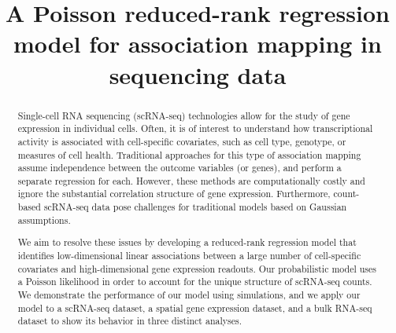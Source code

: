 \documentclass{bmcart}
\begin{document}
\begin{frontmatter}

\begin{fmbox}
\title{A Poisson reduced-rank regression model for association mapping in sequencing data}

\author[
  addressref={aff1},
  email={tianaf@princeton.edu}
]{ }
\author[
  addressref={aff1},
  email={aj13@princeton.edu}
]{ }
\author[
  addressref={aff1,aff2},
  corref={aff1,aff2},
  email={bee@princeton.edu}
]{ }

\address[id=aff1]{
  ,
  ,
  ,
}
\address[id=aff2]{
  ,
  ,
  ,
}

\end{fmbox}%

\begin{abstractbox}

\begin{abstract} %
Single-cell RNA sequencing (scRNA-seq) technologies allow for the study of gene expression in individual cells. Often, it is of interest to understand how transcriptional activity is associated with cell-specific covariates, such as cell type, genotype, or measures of cell health. Traditional approaches for this type of association mapping assume independence between the outcome variables (or genes), and perform a separate regression for each. However, these methods are computationally costly and ignore the substantial correlation structure of gene expression. Furthermore, count-based scRNA-seq data pose challenges for traditional models based on Gaussian assumptions.

We aim to resolve these issues by developing a reduced-rank regression model that identifies low-dimensional linear associations between a large number of cell-specific covariates and high-dimensional gene expression readouts. Our probabilistic model uses a Poisson likelihood in order to account for the unique structure of scRNA-seq counts. We demonstrate the performance of our model using simulations, and we apply our model to a scRNA-seq dataset, a spatial gene expression dataset, and a bulk RNA-seq dataset to show its behavior in three distinct analyses.


\end{abstract}
\end{abstractbox}
\end{frontmatter}
\end{document}
